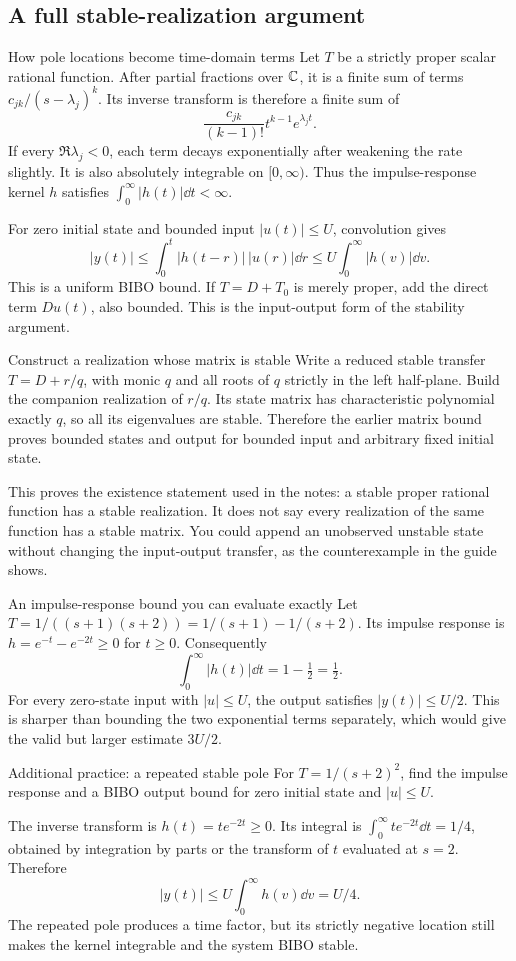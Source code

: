 \subsection{A full stable-realization argument}
\begin{concept}{How pole locations become time-domain terms}
Let $T$ be a strictly proper scalar rational function. After partial fractions over $\mathbb C$, it is a finite sum of terms $c_{jk}/(s-\lambda_j)^k$. Its inverse transform is therefore a finite sum of
\[\frac{c_{jk}}{(k-1)!}t^{k-1}e^{\lambda_jt}.\]
If every $\Re\lambda_j<0$, each term decays exponentially after weakening the rate slightly. It is also absolutely integrable on $[0,\infty)$. Thus the impulse-response kernel $h$ satisfies $\int_0^\infty|h(t)|\dd t<\infty$.

For zero initial state and bounded input $|u(t)|\leq U$, convolution gives
\[|y(t)|\leq\int_0^t |h(t-r)|\,|u(r)|\dd r\leq U\int_0^\infty|h(v)|\dd v.\]
This is a uniform BIBO bound. If $T=D+T_0$ is merely proper, add the direct term $Du(t)$, also bounded. This is the input-output form of the stability argument.
\end{concept}
\begin{method}{Construct a realization whose matrix is stable}
Write a reduced stable transfer $T=D+r/q$, with monic $q$ and all roots of $q$ strictly in the left half-plane. Build the companion realization of $r/q$. Its state matrix has characteristic polynomial exactly $q$, so all its eigenvalues are stable. Therefore the earlier matrix bound proves bounded states and output for bounded input and arbitrary fixed initial state.

This proves the existence statement used in the notes: a stable proper rational function has a stable realization. It does not say every realization of the same function has a stable matrix. You could append an unobserved unstable state without changing the input-output transfer, as the counterexample in the guide shows.
\end{method}
\begin{worked}{An impulse-response bound you can evaluate exactly}
Let $T=1/((s+1)(s+2))=1/(s+1)-1/(s+2)$. Its impulse response is $h=e^{-t}-e^{-2t}\geq0$ for $t\geq0$. Consequently
\[\int_0^\infty|h(t)|\dd t=1-\tfrac12=\tfrac12.\]
For every zero-state input with $|u|\leq U$, the output satisfies $|y(t)|\leq U/2$. This is sharper than bounding the two exponential terms separately, which would give the valid but larger estimate $3U/2$.
\end{worked}
\begin{question}{Additional practice: a repeated stable pole}
For $T=1/(s+2)^2$, find the impulse response and a BIBO output bound for zero initial state and $|u|\leq U$.
\end{question}
\begin{answer}
The inverse transform is $h(t)=te^{-2t}\geq0$. Its integral is $\int_0^\infty te^{-2t}\dd t=1/4$, obtained by integration by parts or the transform of $t$ evaluated at $s=2$. Therefore
\[|y(t)|\leq U\int_0^\infty h(v)\dd v=U/4.\]
The repeated pole produces a time factor, but its strictly negative location still makes the kernel integrable and the system BIBO stable.
\end{answer}

